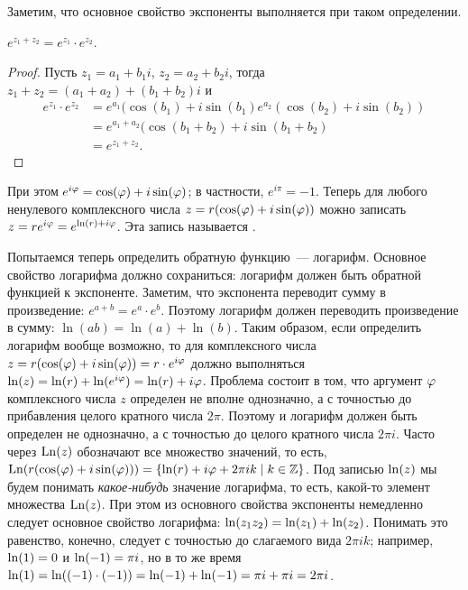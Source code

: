 Заметим, что основное свойство экспоненты выполняется при таком
определении.
\begin{proposition}
$e^{z_1+z_2}=e^{z_1}\cdot e^{z_2}$.
\end{proposition}
\begin{proof}
Пусть $z_1=a_1+b_1i$, $z_2=a_2+b_2i$, тогда
$z_1+z_2=(a_1+a_2)+(b_1+b_2)i$ и
\begin{align*}
e^{z_1}\cdot e^{z_2} &=
e^{a_1}(\cos(b_1)+i\sin(b_1)e^{a_2}(\cos(b_2)+i\sin(b_2))\\
&=e^{a_1+a_2}(\cos(b_1+b_2)+i\sin(b_1+b_2)\\
&=e^{z_1+z_2}.
\end{align*}
\end{proof}

При этом $e^{i\varphi}=\cos(\varphi)+i\sin(\varphi)$; в частности, $e^{i\pi}=-1$.
Теперь для любого ненулевого комплексного числа
$z=r(\cos(\varphi)+i\sin(\varphi))$ можно записать
$z=re^{i\varphi}=e^{\operatorname{ln}(r)+i\varphi}$. Эта запись называется
.

Попытаемся теперь определить обратную функцию~--- логарифм. Основное
свойство логарифма должно сохраниться: логарифм должен быть обратной
функцией к экспоненте. Заметим, что экспонента переводит сумму в
произведение: $e^{a+b} = e^a\cdot e^b$. Поэтому логарифм должен
переводить произведение в сумму: $\ln(ab) = \ln(a) + \ln(b)$.
Таким образом, если определить логарифм вообще возможно,
то для комплексного числа
$z=r(\cos(\varphi)+i\sin(\varphi)) = r\cdot e^{i\varphi}$ должно
выполняться $\operatorname{ln}(z)=\operatorname{ln}(r)+\operatorname{ln}(e^{i\varphi})=\operatorname{ln}(r)+i\varphi$.
Проблема состоит в том, что аргумент $\varphi$ комплексного числа $z$
определен не вполне однозначно, а с точностью до прибавления целого
кратного числа $2\pi$. Поэтому и логарифм должен быть определен не
однозначно, а с точностью до целого кратного числа $2\pi i$.
Часто через $\operatorname{Ln}(z)$ обозначают все множество значений, то есть,
$\operatorname{Ln}(r(\cos(\varphi)+i\sin(\varphi)))=\{\operatorname{ln}(r)+i\varphi+2\pi i k\mid k\in\mathbb Z\}$.
Под записью $\operatorname{ln}(z)$ мы будем понимать {\it какое-нибудь} значение
логарифма, то есть, какой-то элемент множества $\operatorname{Ln}(z)$. При этом из
основного свойства экспоненты немедленно следует основное свойство
логарифма: $\operatorname{ln}(z_1z_2)=\operatorname{ln}(z_1)+\operatorname{ln}(z_2)$. Понимать это равенство,
конечно, следует с точностью до слагаемого вида $2\pi ik$; например,
$\operatorname{ln}(1)=0$ и $\operatorname{ln}(-1)=\pi i$, но в то же время
$\operatorname{ln}(1)=\operatorname{ln}((-1)\cdot(-1))=\operatorname{ln}(-1)+\operatorname{ln}(-1)
=\pi i+\pi i = 2\pi i$.
